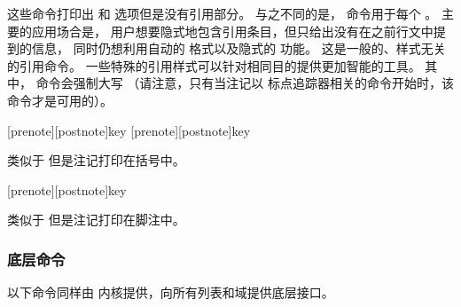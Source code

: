 \begin{ltxsyntax}

这些命令打印出  和  选项但是没有引用部分。
与之不同的是， 命令用于每个 。
主要的应用场合是，
用户想要隐式地包含引用条目，但只给出没有在之前行文中提到的信息，
同时仍想利用自动的  格式以及隐式的  功能。
这是一般的、样式无关的引用命令。
一些特殊的引用样式可以针对相同目的提供更加智能的工具。
其中， 命令会强制大写
（请注意，只有当注记以 \biblatex 标点追踪器相关的命令开始时，该命令才是可用的）。

[prenote][postnote]{key}
[prenote][postnote]{key}

类似于  但是注记打印在括号中。

[prenote][postnote]{key}

类似于  但是注记打印在脚注中。

\end{ltxsyntax}

\subsubsection{底层命令}%
\label{use:cit:low}

以下命令同样由 \biblatex 内核提供，向所有列表和域提供底层接口。


